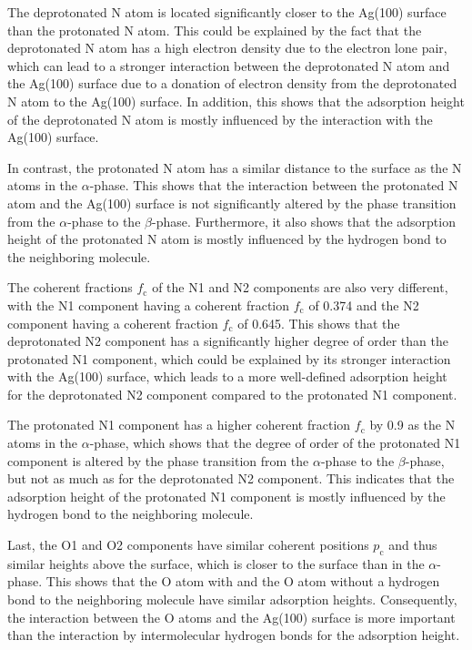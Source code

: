 The deprotonated N atom is located significantly closer to the Ag(100) surface than the protonated N atom. This could be explained by the fact that the deprotonated N atom has a high electron density due to the electron lone pair, which can lead to a stronger interaction between the deprotonated N atom and the Ag(100) surface due to a donation of electron density from the deprotonated N atom to the Ag(100) surface. In addition, this shows that the adsorption height of the deprotonated N atom is mostly influenced by the interaction with the Ag(100) surface.

In contrast, the protonated N atom has a similar distance to the surface as the N atoms in the $\alpha$-phase. This shows that the interaction between the protonated N atom and the Ag(100) surface is not significantly altered by the phase transition from the $\alpha$-phase to the $\beta$-phase. Furthermore, it also shows that the adsorption height of the protonated N atom is mostly influenced by the hydrogen bond to the neighboring molecule.

The coherent fractions $f_\mathrm{c}$ of the N1 and N2 components are also very different, with the N1 component having a coherent fraction $f_\mathrm{c}$ of 0.374 and the N2 component having a coherent fraction $f_\mathrm{c}$ of 0.645. This shows that the deprotonated N2 component has a significantly higher degree of order than the protonated N1 component, which could be explained by its stronger interaction with the Ag(100) surface, which leads to a more well-defined adsorption height for the deprotonated N2 component compared to the protonated N1 component.

The protonated N1 component has a higher coherent fraction $f_\mathrm{c}$  by 0.9 as the N atoms in the $\alpha$-phase, which shows that the degree of order of the protonated N1 component is altered by the phase transition from the $\alpha$-phase to the $\beta$-phase, but not as much as for the deprotonated N2 component. This indicates that the adsorption height of the protonated N1 component is mostly influenced by the hydrogen bond to the neighboring molecule.

Last, the O1 and O2 components have similar coherent positions $p_\mathrm{c}$ and thus similar heights above the surface, which is closer to the surface than in the $\alpha$-phase. This shows that the O atom with and the O atom without a hydrogen bond to the neighboring molecule have similar adsorption heights. Consequently, the interaction between the O atoms and the Ag(100) surface is more important than the interaction by intermolecular hydrogen bonds for the adsorption height. 

